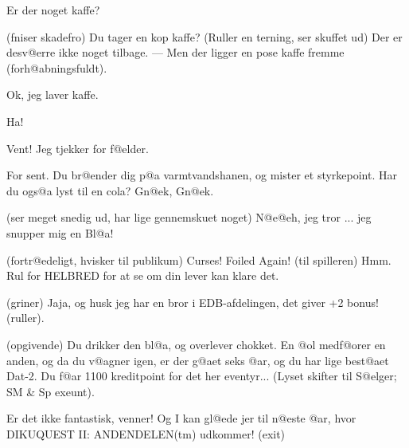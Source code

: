 \documentclass[a4paper,11pt]{article}
\begin{document}
\begin{sketch}
	Er der noget kaffe?

	(fniser skadefro) Du tager en kop kaffe? (Ruller en
terning, ser skuffet ud) Der er desv@erre ikke noget tilbage. --- Men
der ligger en pose kaffe fremme (forh@abningsfuldt).

	Ok, jeg laver kaffe.

 	Ha!

	Vent! Jeg tjekker for f@elder.

	For sent. Du br@ender dig p@a varmtvandshanen, og
mister et styrkepoint. Har du ogs@a lyst til en cola? Gn@ek, Gn@ek.

	(ser meget snedig ud, har lige gennemskuet noget)
N@e@eh, jeg tror ...  jeg snupper mig en Bl@a!

	(fortr@edeligt, hvisker til publikum) Curses! Foiled
Again! (til spilleren) Hmm. Rul for HELBRED for at se om din lever kan
klare det.

	(griner) Jaja, og husk jeg har en bror i EDB-afdelingen, det giver +2
bonus! (ruller).

	(opgivende) Du drikker den bl@a, og overlever chokket. En @ol medf@orer
en anden, og da du v@agner igen, er der g@aet seks @ar, og du har lige best@aet
Dat-2. Du f@ar 1100 kreditpoint for det her eventyr... (Lyset skifter til
S@elger; SM \& Sp exeunt).

	Er det ikke fantastisk, venner! Og I kan gl@ede jer til n@este @ar, hvor
DIKUQUEST II: ANDENDELEN(tm) udkommer! (exit)
\end{sketch}
\end{document}
